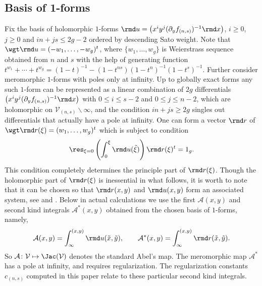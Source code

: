 \subsection{Basis of 1-forms}\label{ss:CoHomolBasis}
Fix the basis of holomorphic $1$-forms $\rmd u = \big(x^i y^j (\partial_y f_{(n,s)})^{-1}\rmd x\big)$, $i\geqslant 0$, $j\geqslant 0$ and $i n+j s\leqslant 2g-2$ ordered by descending Sato weight. Note that $\wgt \rmd u = ({-}w_1,\dots,{-}w_g)^t$, where $\{w_1,\dots,w_g\}$ is Weierstrass sequence obtained from $n$ and $s$ with the help of generating function $t^{w_1}+\cdots +t^{w_g}= (1-t)^{-1}- (1-t^{ns}) (1-t^n)^{-1}(1-t^s)^{-1}$. Further consider meromorphic $1$-forms with poles only at infinity. Up to globally exact forms any such $1$-form can be represented as a linear combination of $2g$ differentials $\big(x^i y^j (\partial_y f_{(n,s)})^{-1} \rmd x\big)$ with $0\leqslant i \leqslant s-2$ and $0\leqslant j \leqslant n-2$, which are holomorphic on $\mathcal{V}_{(n,s)}\backslash \infty$, and the condition $i n+j s\geqslant 2g$ singles out differentials that actually have a pole at infinity. One can form a vector $\rmd r$ of $\wgt \rmd r(\xi) = (w_1,\dots,w_g)^t$ which is subject to condition
\begin{gather}\label{DiffAjst}
\res_{\xi=0} \left(\int_0^{\xi} \rmd u(\tilde{\xi})\right) \rmd r(\xi)^t = 1_g.
\end{gather}
This condition completely determines the {principle part of $\rmd r(\xi)$.} Though the holomorphic part of $\rmd r(\xi)$ is inessential in what follows, it is {worth} to note that it can be chosen so that $\rmd r(x,y)$ and $\rmd u(x,y)$ form an associated system, see \cite[Section~138]{BakerAF} and \cite[p.~131]{EEL2000}. Below in actual calculations we use the {first $\mathcal{A}(x,y)$ and second kind integrals $\mathcal{A}^\ast(x,y)$ obtained from the chosen basis of $1$-forms}, namely,
\begin{gather*}\mathcal{A}(x,y) = \int_{\infty}^{(x,y)} \rmd u(\tilde{x},\tilde{y}),\qquad \mathcal{A}^\ast(x,y) = \int_{\infty}^{(x,y)} \rmd r(\tilde{x},\tilde{y}).\end{gather*}
So $\mathcal{A}\colon \mathcal{V} \mapsto \Jac(\mathcal{V})$ denotes the standard Abel's map. The meromorphic map $\mathcal{A}^\ast$ has a pole at infinity, and requires regularization. The regularization constants~$c_{(n,s)}$ computed in this paper relate to these particular second kind integrals.

